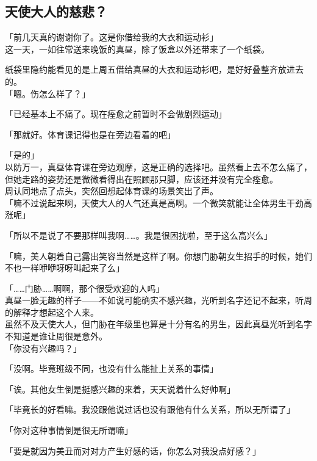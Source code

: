 \subsection{天使大人的慈悲？}

「前几天真的谢谢你了。这是你借给我的大衣和运动衫」\\

这一天，一如往常送来晚饭的真昼，除了饭盒以外还带来了一个纸袋。

纸袋里隐约能看见的是上周五借给真昼的大衣和运动衫吧，是好好叠整齐放进去的。\\

「嗯。伤怎么样了？」

「已经基本上不痛了。现在痊愈之前暂时不会做剧烈运动」

「那就好。体育课记得也是在旁边看着的吧」

「是的」\\

以防万一，真昼体育课在旁边观摩，这是正确的选择吧。虽然看上去不怎么痛了，但她走路的姿势还是微微看得出在照顾那只脚，应该还并没有完全痊愈。\\

周认同地点了点头，突然回想起体育课的场景笑出了声。\\

「嘛不过说起来啊，天使大人的人气还真是高啊。一个微笑就能让全体男生干劲高涨呢」

「所以不是说了不要那样叫我啊……。我是很困扰啦，至于这么高兴么」

「嘛，美人朝着自己露出笑容当然是这样了啊。你想门胁朝女生招手的时候，她们不也一样咿咿呀呀叫起来了么」

「……门胁……啊啊，那个很受欢迎的人吗」\\

真昼一脸无趣的样子——不如说可能确实不感兴趣，光听到名字还记不起来，听周的解释才想起这个人来。\\

虽然不及天使大人，但门胁在年级里也算是十分有名的男生，因此真昼光听到名字不知道是谁让周很是意外。\\

「你没有兴趣吗？」

「没啊。毕竟班级不同，也没有什么能扯上关系的事情」

「诶。其他女生倒是挺感兴趣的来着，天天说着什么好帅啊」

「毕竟长的好看嘛。我没跟他说过话也没有跟他有什么关系，所以无所谓了」

「你对这种事情倒是很无所谓嘛」

「要是就因为美丑而对对方产生好感的话，你怎么对我没点好感？」

